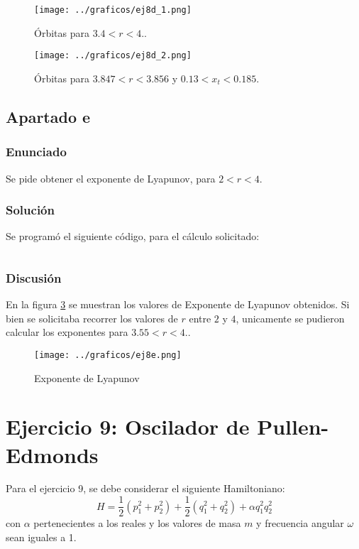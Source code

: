 \documentclass[a4paper,10pt]{paper}
\begin{document}
\begin{figure}[!h]
 \centering
 \texttt{[image: ../graficos/ej8d\_1.png]}
 \caption{\'Orbitas para $3.4 < r < 4.$.}
 \label{fig:8d_1}
\end{figure}

\begin{figure}[!h]
 \centering
 \texttt{[image: ../graficos/ej8d\_2.png]}
 \caption{\'Orbitas para $3.847 < r < 3.856$ y $0.13 < x_t < 0.185$.}
 \label{fig:8d_2}
\end{figure}

\subsection{Apartado e}
\subsubsection{Enunciado}
Se pide obtener el exponente de Lyapunov, para $2<r<4$.

\subsubsection{Soluci\'on}
Se program\'o el siguiente c\'odigo, para el c\'alculo solicitado:
\inputminted[firstline=16, linenos, firstnumber=1]{fortran}{../8/ej8e.f90}

\subsubsection{Discusi\'on}
En la figura \ref{fig:ej8e} se muestran los valores de Exponente de Lyapunov obtenidos.
Si bien se solicitaba recorrer los valores de $r$ entre $2$ y $4$, unicamente se pudieron calcular los 
exponentes para $3.55 < r < 4.$.

\begin{figure}[!h]
 \centering
 \texttt{[image: ../graficos/ej8e.png]}
 \caption{Exponente de Lyapunov}
 \label{fig:ej8e}
\end{figure}

\section{Ejercicio 9: Oscilador de Pullen-Edmonds}
Para el ejercicio 9, se debe considerar el siguiente Hamiltoniano:
\begin{displaymath}
 H = \frac{1}{2}(p_1^2 + p_2^2) + \frac{1}{2}(q_1^2 + q_2^2) + \alpha q_1^2 q_2^2
\end{displaymath}
con $\alpha$ pertenecientes a los reales y los valores de masa $m$ y frecuencia angular
$\omega$ sean iguales a 1.
\end{document}
